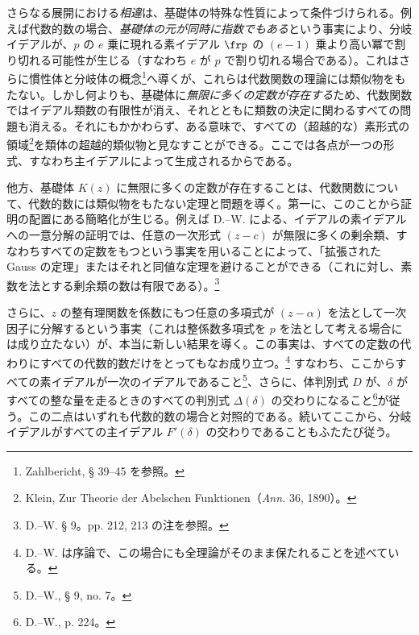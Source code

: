 \documentclass[11pt]{article}
\begin{document}
さらなる展開における\emph{相違}は、基礎体の特殊な性質によって条件づけられる。例えば代数的数の場合、\emph{基礎体の元が同時に指数でもある}という事実により、分岐イデアルが、\(p\) の \(e\) 乗に現れる素イデアル \(\frp\) の \((e-1)\) 乗より高い冪で割り切れる可能性が生じる（すなわち \(e\) が \(p\) で割り切れる場合である）。これはさらに慣性体と分岐体の概念\footnote{Zahlbericht, § 39--45 を参照。}へ導くが、これらは代数関数の理論には類似物をもたない。しかし何よりも、基礎体に\emph{無限に多くの定数が存在する}ため、代数関数ではイデアル類数の有限性が消え、それとともに類数の決定に関わるすべての問題も消える。それにもかかわらず、ある意味で、すべての（超越的な）素形式の領域\footnote{Klein, Zur Theorie der Abelschen Funktionen（\emph{Ann.} 36, 1890）。}を類体の超越的類似物と見なすことができる。ここでは各点が一つの形式、すなわち主イデアルによって生成されるからである。

他方、基礎体 \(K(z)\) に無限に多くの定数が存在することは、代数関数について、代数的数には類似物をもたない定理と問題を導く。第一に、このことから証明の配置にある簡略化が生じる。例えば D.--W. による、イデアルの素イデアルへの一意分解の証明では、任意の一次形式 \((z-c)\) が無限に多くの剰余類、すなわちすべての定数をもつという事実を用いることによって、「拡張された Gauss の定理」またはそれと同値な定理を避けることができる（これに対し、素数を法とする剰余類の数は有限である）。\footnote{D.--W. § 9。pp. 212, 213 の注を参照。}

さらに、\(z\) の整有理関数を係数にもつ任意の多項式が \((z-\alpha)\) を法として一次因子に分解するという事実（これは整係数多項式を \(p\) を法として考える場合には成り立たない）が、本当に新しい結果を導く。この事実は、すべての定数の代わりにすべての代数的数だけをとってもなお成り立つ。\footnote{D.--W. は序論で、この場合にも全理論がそのまま保たれることを述べている。} すなわち、ここからすべての素イデアルが一次のイデアルであること\footnote{D.--W., § 9, no. 7。}、さらに、体判別式 \(D\) が、\(\delta\) がすべての整な量を走るときのすべての判別式 \(\Delta(\delta)\) の交わりになること\footnote{D.--W., p. 224。}が従う。この二点はいずれも代数的数の場合と対照的である。続いてここから、分岐イデアルがすべての主イデアル \(F'(\delta)\) の交わりであることもふたたび従う。
\end{document}
